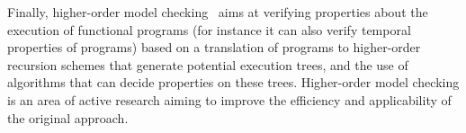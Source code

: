 Finally, higher-order model checking~\cite{koba-ppdp09,koba-popl09} aims at verifying
properties about the execution of functional programs (for instance it can also verify
temporal properties of programs) based on a translation of programs to higher-order 
recursion schemes that generate potential execution trees, and the use of algorithms 
that can decide properties on these trees. Higher-order model checking is an area of 
active research aiming to improve the efficiency and applicability of the original 
approach.

